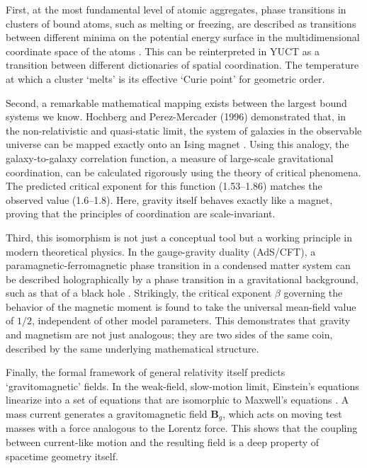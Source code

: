 \documentclass[12pt]{article}
\theoremstyle{remark}
\begin{document}
	First, at the most fundamental level of atomic aggregates, phase transitions in clusters
	of bound atoms, such as melting or freezing, are described as transitions between different
	minima on the potential energy surface in the multidimensional coordinate space of the atoms
	\cite{Berry2005}. This can be reinterpreted in YUCT as a transition between different
	dictionaries of spatial coordination. The temperature at which a cluster `melts' is its
	effective `Curie point' for geometric order.
	
	Second, a remarkable mathematical mapping exists between the largest bound systems we know.
	Hochberg and Perez-Mercader (1996) demonstrated that, in the non-relativistic and
	quasi-static limit, the system of galaxies in the observable universe can be mapped exactly
	onto an Ising magnet \cite{Hochberg1996}. Using this analogy, the galaxy-to-galaxy correlation
	function, a measure of large-scale gravitational coordination, can be calculated rigorously
	using the theory of critical phenomena. The predicted critical exponent for this function
	(1.53--1.86) matches the observed value (1.6--1.8). Here, gravity itself behaves exactly like a
	magnet, proving that the principles of coordination are scale-invariant.
	
	Third, this isomorphism is not just a conceptual tool but a working principle in modern
	theoretical physics. In the gauge-gravity duality (AdS/CFT), a paramagnetic-ferromagnetic
	phase transition in a condensed matter system can be described holographically by a phase
	transition in a gravitational background, such as that of a black hole
	\cite{Ghotbabadi2021, Zbl2021}. Strikingly, the critical exponent \(\beta\) governing the
	behavior of the magnetic moment is found to take the universal mean-field value of \(1/2\),
	independent of other model parameters. This demonstrates that gravity and magnetism are not
	just analogous; they are two sides of the same coin, described by the same underlying
	mathematical structure.
	
	Finally, the formal framework of general relativity itself predicts `gravitomagnetic' fields.
	In the weak-field, slow-motion limit, Einstein's equations linearize into a set of equations
	that are isomorphic to Maxwell's equations \cite{ciufolini1995}. A mass current
	generates a gravitomagnetic field \( \mathbf{B}_g \), which acts on moving test masses with a
	force analogous to the Lorentz force. This shows that the coupling between current-like
	motion and the resulting field is a deep property of spacetime geometry itself.
	
\end{document}
